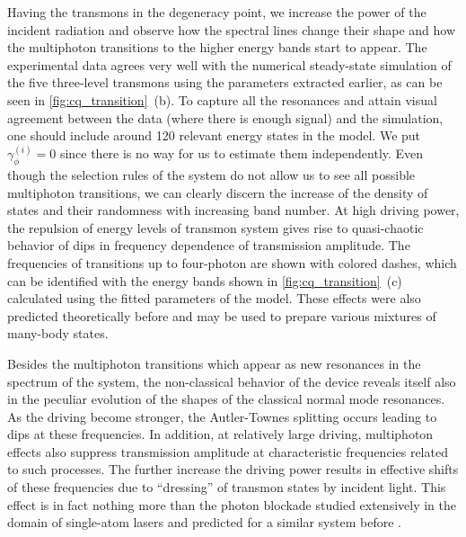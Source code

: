 \documentclass[%
 aps, pra,
 amsmath,amssymb,
 reprint,%
superscriptaddress
]{revtex4-2}
\begin{document}
Having the transmons in the degeneracy point, we increase the power of the incident radiation and observe how the spectral lines change their shape and how the multiphoton transitions to the higher energy bands start to appear. The experimental data agrees very well with the numerical steady-state simulation of the five three-level transmons using the parameters extracted earlier, as can be seen in \autoref{fig:cq_transition}~(b). To capture all the resonances and attain visual agreement between the data (where there is enough signal) and the simulation, one should include around 120 relevant energy states in the model. We put $\gamma_\phi^{(i)} = 0$ since there is no way for us to estimate them independently. Even though the selection rules of the system do not allow us to see all possible multiphoton transitions, we can clearly discern the increase of the density of states and their randomness with increasing band number. At high driving power, the repulsion of energy levels of transmon system gives rise to quasi-chaotic behavior of dips in frequency dependence of transmission amplitude. The frequencies of transitions up to four-photon are shown with colored dashes, which can be identified with the energy bands shown in \autoref{fig:cq_transition}~(c) calculated using the fitted parameters of the model. These effects were also predicted theoretically before \cite{Biella2015} and may be used to prepare various mixtures of many-body states.

Besides the multiphoton transitions which appear as new resonances in the spectrum of the system, the non-classical behavior of the device reveals itself also in the peculiar evolution of the shapes of the classical normal mode resonances. As the driving become stronger, the Autler-Townes splitting occurs leading to dips at these frequencies. In addition, at relatively large driving, multiphoton effects also suppress transmission amplitude at characteristic frequencies related to such processes. The further increase the driving power results in effective shifts of these frequencies due to ``dressing'' of transmon states by incident light. This effect is in fact nothing more than the photon blockade studied extensively in the domain of single-atom lasers \cite{birnbaum2005photon} and predicted for a similar system before \cite{Biella2015}.
\end{document}
